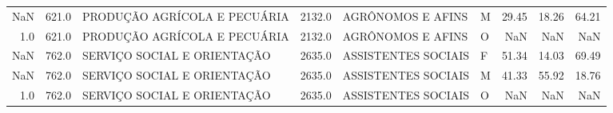 \begin{table}
\begin{tabular}{rrlrllrrr}
     NaN &  621.0 &          PRODUÇÃO AGRÍCOLA E PECUÁRIA & 2132.0 &                                  AGRÔNOMOS E AFINS &      M & 29.45 & 18.26 & 64.21 \\
     1.0 &  621.0 &          PRODUÇÃO AGRÍCOLA E PECUÁRIA & 2132.0 &                                  AGRÔNOMOS E AFINS &      O &   NaN &   NaN &   NaN \\
     NaN &  762.0 &           SERVIÇO SOCIAL E ORIENTAÇÃO & 2635.0 &                                ASSISTENTES SOCIAIS &      F & 51.34 & 14.03 & 69.49 \\
     NaN &  762.0 &           SERVIÇO SOCIAL E ORIENTAÇÃO & 2635.0 &                                ASSISTENTES SOCIAIS &      M & 41.33 & 55.92 & 18.76 \\
     1.0 &  762.0 &           SERVIÇO SOCIAL E ORIENTAÇÃO & 2635.0 &                                ASSISTENTES SOCIAIS &      O &   NaN &   NaN &   NaN \\
\bottomrule
\end{tabular}
\end{table}
